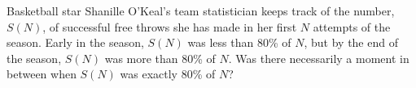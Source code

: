 Basketball star Shanille O'Keal's team statistician
keeps track of the number, $S(N)$, of successful free throws she has made
in her first $N$ attempts of the season.
Early in the season, $S(N)$  was less than 80\% of  $N$,
but by the end of the season, $S(N)$ was more than 80\% of $N$.
Was there necessarily a moment in between when $S(N)$ was exactly 80\% of
$N$?
